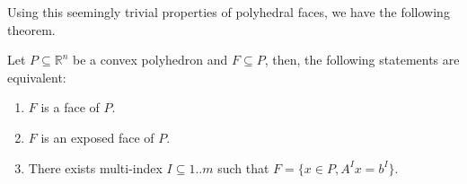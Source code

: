 Using this seemingly trivial properties of polyhedral faces, we have the
following theorem.

\begin{theorem}
\label{thr:Face Representation Theorem}
  Let \( P \subseteq \mathbb{R}^{n} \) be a convex polyhedron and \( F \subseteq
  P \), then, the following statements are equivalent:

  \begin{enumerate}
    \item \( F \) is a face of \( P \).
    \item \( F \) is an exposed face of \( P \).
    \item There exists multi-index \( I \subseteq 1..m \) such that \( F = \{x
      \in P, A^{I}x = b^{I}\}   \).
  \end{enumerate}
\end{theorem}


